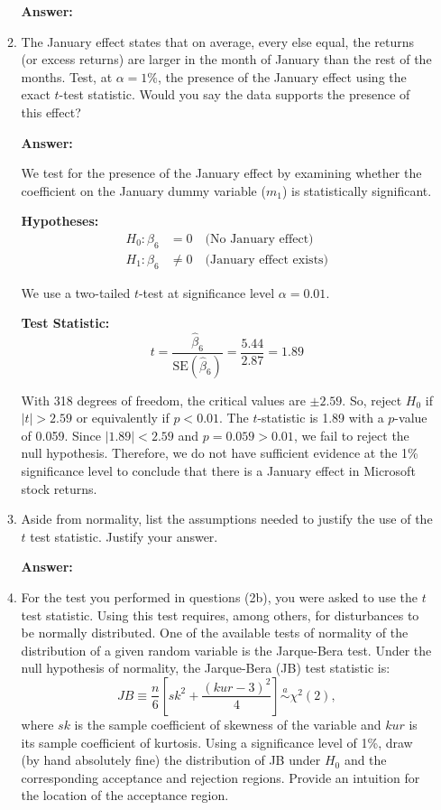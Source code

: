 \documentclass[12pt,a4paper]{article}
\begin{document}
\begin{enumerate}[label=(\roman*)]
\begin{enumerate}[label=(\alph*)]
  \textbf{Answer:} 

  
  
  \item The January effect states that on average, every else equal, the returns (or excess returns) are larger in the month of January than the rest of the months. Test, at $\alpha = 1\%$, the presence of the January effect using the exact $t$-test statistic. Would you say the data supports the presence of this effect?
  
  \textbf{Answer:} 

  We test for the presence of the January effect by examining whether the coefficient on the January dummy variable ($m_1$) is statistically significant.

  \textbf{Hypotheses:}
  \begin{align*}
      H_0: \beta_6 &= 0 \quad \text{(No January effect)} \\
      H_1: \beta_6 &\neq 0 \quad \text{(January effect exists)}
  \end{align*}

  We use a two-tailed $t$-test at significance level $\alpha = 0.01$.

    \textbf{Test Statistic:}
      \[
          t = \frac{\hat{\beta}_6}{\text{SE}(\hat{\beta}_6)} = \frac{5.44}{2.87} = 1.89
      \]

  With 318 degrees of freedom, the critical values are $\pm 2.59$. So, reject $H_0$ if $|t| > 2.59$ or equivalently if $p < 0.01$.
  The $t$-statistic is 1.89 with a $p$-value of 0.059. Since $|1.89| < 2.59$ and $p = 0.059 > 0.01$, we fail to reject the null hypothesis.
  Therefore, we do not have sufficient evidence at the 1\% significance level to conclude that there is a January effect in Microsoft stock returns.
  
  \item Aside from normality, list the assumptions needed to justify the use of the $t$ test statistic. Justify your answer.
  
  \textbf{Answer:} 
  
  \item For the test you performed in questions (2b), you were asked to use the $t$ test statistic. Using this test requires, among others, for disturbances to be normally distributed. One of the available tests of normality of the distribution of a given random variable is the Jarque-Bera test. Under the null hypothesis of normality, the Jarque-Bera (JB) test statistic is:
  \[
  JB \equiv \frac{n}{6}\left[sk^2 + \frac{(kur - 3)^2}{4}\right] \stackrel{a}{\sim} \chi^2(2),
  \]
  where $sk$ is the sample coefficient of skewness of the variable and $kur$ is its sample coefficient of kurtosis. Using a significance level of 1\%, draw (by hand absolutely fine) the distribution of JB under $H_0$ and the corresponding acceptance and rejection regions. Provide an intuition for the location of the acceptance region.
  

\end{enumerate}
\end{enumerate}
\end{document}
